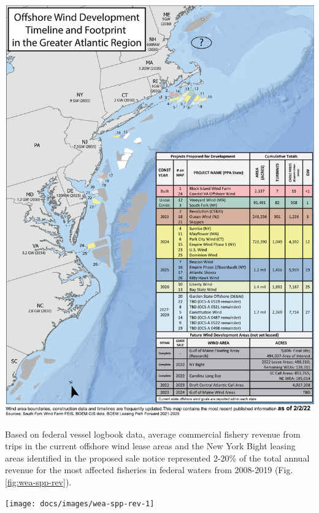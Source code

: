 \documentclass[
  10pt,
]{article}
\let\origfigure\figure
\let\endorigfigure\endfigure
\renewenvironment{figure}[1][2] {
    \expandafter\origfigure\expandafter[H]
} {
    \endorigfigure
}
\begin{document}
\begin{figure}

{\centering \includegraphics[width=0.9\linewidth]{images/offshore_wind_timeline} 

}

\caption{All Northeast Project areas by year construction ends (each project has 2 year construction period).}\label{fig:wind-dev-cumul}
\end{figure}

Based on federal vessel logbook data, average commercial fishery revenue
from trips in the current offshore wind lease areas and the New York
Bight leasing areas identified in the proposed sale notice represented
2-20\% of the total annual revenue for the most affected fisheries in
federal waters from 2008-2019 (Fig. \ref{fig:wea-spp-rev}).

\begin{figure}

{\centering \texttt{[image: docs/images/wea-spp-rev-1]} 

}

\caption{Wind energy revenue in the Mid-Atlantic}\label{fig:wea-spp-rev}
\end{figure}
\end{document}
